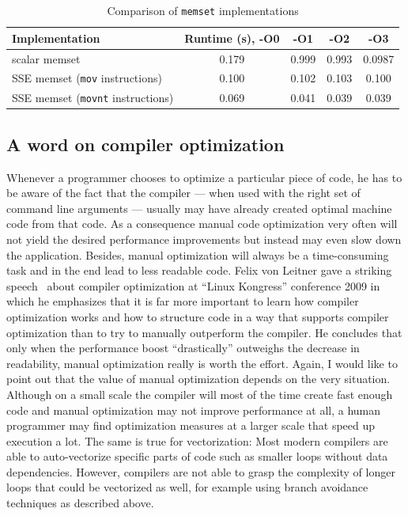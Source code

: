 \begin{table}[h]
\begin{center}
\caption{Comparison of \texttt{memset} implementations}
\begin{tabular}{lcccc}
\toprule
Implementation & Runtime (s), -O0 & -O1 & -O2 & -O3 \\
\midrule
scalar memset & 0.179 & 0.999 & 0.993 & 0.0987 \\
SSE memset (\texttt{mov} instructions) & 0.100 & 0.102 & 0.103 & 0.100 \\
SSE memset (\texttt{movnt} instructions) & 0.069 & 0.041 & 0.039 & 0.039 \\
\bottomrule
\end{tabular}
\label{memset_table}
\end{center}
\end{table}

\subsection{A word on compiler optimization}
Whenever a programmer chooses to optimize a particular piece of code, he has to be aware of the fact that the compiler --- when used with the right set of command line arguments --- usually may have already created optimal machine code from that code. As a consequence manual code optimization very often will not yield the desired performance improvements but instead may even slow down the application. Besides, manual optimization will always be a time-consuming task and in the end lead to less readable code. Felix von Leitner gave a striking speech~\cite{leitner2009} about compiler optimization at ``Linux Kongress'' conference 2009 in which he emphasizes that it is far more important to learn how compiler optimization works and how to structure code in a way that supports compiler optimization than to try to manually outperform the compiler. He concludes that only when the performance boost ``drastically'' outweighs the decrease in readability, manual optimization really is worth the effort. Again, I would like to point out that the value of manual optimization depends on the very situation. Although on a small scale the compiler will most of the time create fast enough code and manual optimization may not improve performance at all, a human programmer may find optimization measures at a larger scale that speed up execution a lot. The same is true for vectorization: Most modern compilers are able to auto-vectorize specific parts of code such as smaller loops without data dependencies. However, compilers are not able to grasp the complexity of longer loops that could be vectorized as well, for example using branch avoidance techniques as described above.